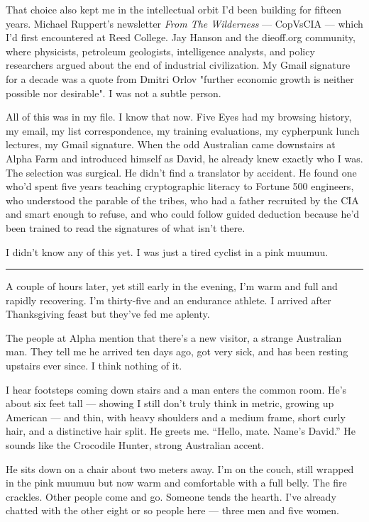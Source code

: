That choice also kept me in the intellectual orbit I'd been building for fifteen years. Michael Ruppert's newsletter \textit{From The Wilderness} --- CopVsCIA --- which I'd first encountered at Reed College. Jay Hanson and the dieoff.org community, where physicists, petroleum geologists, intelligence analysts, and policy researchers argued about the end of industrial civilization. My Gmail signature for a decade was a quote from Dmitri Orlov "further economic growth is neither possible nor desirable". I was not a subtle person.

All of this was in my file. I know that now. Five Eyes had my browsing history, my email, my list correspondence, my training evaluations, my cypherpunk lunch lectures, my Gmail signature. When the odd Australian came downstairs at Alpha Farm and introduced himself as David, he already knew exactly who I was. The selection was surgical. He didn't find a translator by accident. He found one who'd spent five years teaching cryptographic literacy to Fortune 500 engineers, who understood the parable of the tribes, who had a father recruited by the CIA and smart enough to refuse, and who could follow guided deduction because he'd been trained to read the signatures of what isn't there.

I didn't know any of this yet. I was just a tired cyclist in a pink muumuu.

\vspace{1cm}\noindent\rule{0.5\textwidth}{0.5pt}\vspace{0.5cm}

A couple of hours later, yet still early in the evening, I'm warm and full and rapidly recovering. I'm thirty-five and an endurance athlete. I arrived after Thanksgiving feast but they've fed me aplenty.

The people at Alpha mention that there's a new visitor, a strange Australian man. They tell me he arrived ten days ago, got very sick, and has been resting upstairs ever since. I think nothing of it.

I hear footsteps coming down stairs and a man enters the common room. He's about six feet tall --- showing I still don't truly think in metric, growing up American --- and thin, with heavy shoulders and a medium frame, short curly hair, and a distinctive hair split. He greets me. ``Hello, mate. Name's David.'' He sounds like the Crocodile Hunter, strong Australian accent.

He sits down on a chair about two meters away. I'm on the couch, still wrapped in the pink muumuu but now warm and comfortable with a full belly. The fire crackles. Other people come and go. Someone tends the hearth. I've already chatted with the other eight or so people here --- three men and five women.

